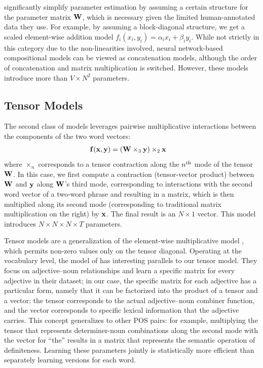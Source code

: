 \documentclass[11pt,letterpaper]{article}
\newcommand{\bX}{{\bf x}}
\newcommand{\bY}{{\bf y}}
\newcommand{\bF}{{\bf f}}
\newcommand{\bW}{{\bf W}}
\begin{document}
 significantly simplify parameter estimation by assuming a certain structure for the parameter matrix $\bW$, which is necessary given the limited human-annotated data they use.   
For example, by assuming a block-diagonal structure, we get a scaled element-wise addition model $f_i (x_i, y_i) = \alpha_i x_i + \beta_i y_i$. 
While not strictly in this category due to the non-linearities involved, neural network-based compositional models \cite{Socher2013,Hermann2013} can be viewed as concatenation models, although the order of concatenation and matrix multiplication is switched. 
However, these models introduce more than $V \times N^2$ parameters. 

\subsection{Tensor Models}
\label{sec:tensor}

The second class of models leverages pairwise multiplicative interactions between the components of the two word vectors:
\begin{align}
	\bF (\bX, \bY) &= (\bW \times_3 \bY) \times_2 \bX
	\label{eq:tensor}
\end{align}
where $\times_n$ corresponds to a tensor contraction along the $n\textsuperscript{th}$ mode of the tensor $\bW$. 
In this case, we first compute a contraction (tensor-vector product) between $\bW$ and $\bY$ along $\bW$'s third mode, corresponding to interactions with the second word vector of a two-word phrase and resulting in a matrix, which is then multiplied along its second mode (corresponding to traditional matrix multiplication on the right) by $\bX$.  
The final result is an $N \times 1$ vector.  
This model introduces $N \times N \times N \times T$ parameters.  

Tensor models are a generalization of the element-wise multiplicative model \cite{Mitchell2008}, which permits non-zero values only on the tensor diagonal.  
Operating at the vocabulary level, the model of  has interesting parallels to our tensor model. 
They focus on adjective--noun relationships and learn a specific matrix for every adjective in their dataset; in our case, the specific matrix for each adjective has a particular form, namely that it can be factorized into the product of a tensor and a vector; the tensor corresponds to the actual adjective--noun combiner function, and the vector corresponds to specific lexical information that the adjective carries. 
This concept generalizes to other POS pairs: for example, multiplying the tensor that represents determiner-noun combinations along the second mode with the vector for ``the'' results in a matrix that represents the semantic operation of definiteness. 
Learning these parameters jointly is statistically more efficient than separately learning versions for each word.
\end{document}
